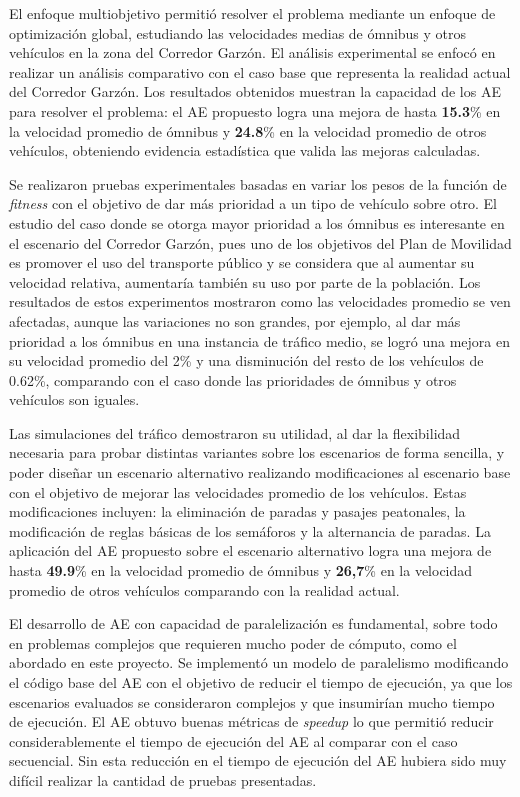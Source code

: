 El enfoque multiobjetivo permitió resolver el problema mediante un enfoque de optimización global, estudiando las velocidades medias de ómnibus y otros vehículos en la zona del Corredor Garzón. El análisis experimental se enfocó en realizar un análisis comparativo con el caso base que representa la realidad actual del Corredor Garzón. Los resultados obtenidos muestran la capacidad de los AE para resolver el problema: el AE propuesto logra una mejora de hasta \textbf{15.3}\% en la velocidad promedio de ómnibus y \textbf{24.8}\% en la velocidad promedio de otros vehículos, obteniendo evidencia estadística que valida las mejoras calculadas.

Se realizaron pruebas experimentales basadas en variar los pesos de la función de \emph{fitness} con el objetivo de dar más prioridad a un tipo de vehículo sobre otro. El estudio del caso donde se otorga mayor prioridad a los ómnibus es interesante en el escenario del Corredor Garzón, pues uno de los objetivos del Plan de Movilidad es promover el uso del transporte público y se considera que al aumentar su velocidad relativa, aumentaría también su uso por parte de la población. Los resultados de estos experimentos mostraron como las velocidades promedio se ven afectadas, aunque las variaciones no son grandes, por ejemplo, al dar más prioridad a los ómnibus en una instancia de tráfico medio, se logró una mejora en su velocidad promedio del 2\% y una disminución del resto de los vehículos de 0.62\%, comparando con el caso donde las prioridades de ómnibus y otros vehículos son iguales.

Las simulaciones del tráfico demostraron su utilidad, al dar la flexibilidad necesaria para probar distintas variantes sobre los escenarios de forma sencilla, y poder diseñar un escenario alternativo realizando modificaciones al escenario base con el objetivo de mejorar las velocidades promedio de los vehículos. Estas modificaciones incluyen: la eliminación de paradas y pasajes peatonales, la modificación de reglas básicas de los semáforos y la alternancia de paradas. La aplicación del AE propuesto sobre el escenario alternativo logra una mejora de hasta \textbf{49.9}\% en la velocidad promedio de ómnibus y \textbf{26,7}\% en la velocidad promedio de otros vehículos comparando con la realidad actual.

El desarrollo de AE con capacidad de paralelización es fundamental, sobre todo en problemas complejos que requieren mucho poder de cómputo, como el abordado en este proyecto. Se implementó un modelo de paralelismo modificando el código base del AE con el objetivo de reducir el tiempo de ejecución, ya que los escenarios evaluados se consideraron complejos y que insumirían mucho tiempo de ejecución. El AE obtuvo buenas métricas de \emph{speedup} lo que permitió reducir considerablemente el tiempo de ejecución del AE al comparar con el caso secuencial. Sin esta reducción en el tiempo de ejecución del AE hubiera sido muy difícil realizar la cantidad de pruebas presentadas.

